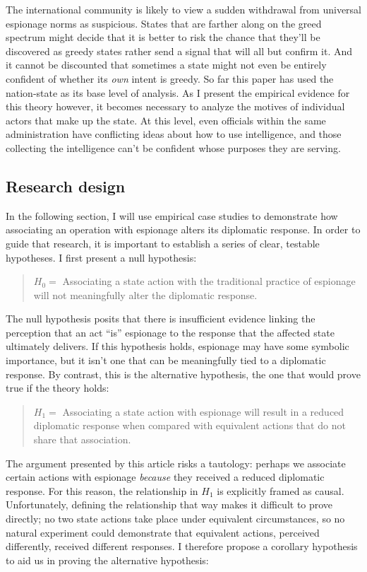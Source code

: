 \documentclass[12pt]{extarticle}
\begin{document}
The international community is likely to view a sudden withdrawal from universal espionage norms as suspicious. States that are farther along on the greed spectrum might decide that it is better to risk the chance that they'll be discovered as greedy states rather send a signal that will all but confirm it. And it cannot be discounted that sometimes a state might not even be entirely confident of whether its \emph{own} intent is greedy. So far this paper has used the nation-state as its base level of analysis. As I present the empirical evidence for this theory however, it becomes necessary to analyze the motives of individual actors that make up the state. At this level, even officials within the same administration have conflicting ideas about how to use intelligence, and those collecting the intelligence can't be confident whose purposes they are serving.

\subsection{Research design}
In the following section, I will use empirical case studies to demonstrate how associating an operation with espionage alters its diplomatic response. In order to guide that research, it is important to establish a series of clear, testable hypotheses. I first present a null hypothesis:

\begin{quote}
$H_0 =$ Associating a state action with the traditional practice of espionage will not meaningfully alter the diplomatic response.
\end{quote}

The null hypothesis posits that there is insufficient evidence linking the perception that an act \enquote{is} espionage to the response that the affected state ultimately delivers. If this hypothesis holds, espionage may have some symbolic importance, but it isn't one that can be meaningfully tied to a diplomatic response. By contrast, this is the alternative hypothesis, the one that would prove true if the theory holds:

\begin{quote}
$H_1 =$ Associating a state action with espionage will result in a reduced diplomatic response when compared with equivalent actions that do not share that association.
\end{quote}

The argument presented by this article risks a tautology: perhaps we associate certain actions with espionage \emph{because} they received a reduced diplomatic response. For this reason, the relationship in $H_1$ is explicitly framed as causal. Unfortunately, defining the relationship that way makes it difficult to prove directly; no two state actions take place under equivalent circumstances, so no natural experiment could demonstrate that equivalent actions, perceived differently, received different responses. I therefore propose a corollary hypothesis to aid us in proving the alternative hypothesis:
\end{document}
